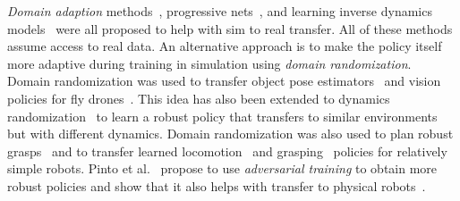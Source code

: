 \emph{Domain adaption} methods~\citep{DBLP:journals/corr/TzengDHFPLSD15, DBLP:journals/corr/GuptaDLAL17}, progressive nets~\citep{DBLP:conf/corl/RusuVRHPH17}, and learning inverse dynamics models~\citep{DBLP:journals/corr/ChristianoSMSBT16} were all proposed to help with sim to real transfer.
All of these methods assume access to real data.
An alternative approach is to make the policy itself more adaptive during training in simulation using \emph{domain randomization}.
Domain randomization was used to transfer object pose estimators~\citep{tobin2017domain} and vision policies for fly drones~\citep{DBLP:conf/rss/SadeghiL17}.
This idea has also been extended to dynamics randomization~\citep{DBLP:journals/corr/AntonovaCSK17, DBLP:journals/corr/abs-1804-10332, DBLP:conf/rss/YuTLT17} to learn a robust policy that transfers to similar environments but with different dynamics.
Domain randomization was also used to plan robust grasps~\citep{DBLP:conf/rss/MahlerLNLDLOG17, DBLP:journals/corr/abs-1709-06670, DBLP:journals/corr/abs-1710-06425} and to transfer learned locomotion~\citep{DBLP:journals/corr/abs-1804-10332} and grasping~\citep{DBLP:journals/corr/abs-1802-09564} policies for relatively simple robots.
Pinto et al.~\citep{DBLP:conf/icml/PintoDSG17} propose to use \emph{adversarial training} to obtain more robust policies and show that it also helps with transfer to physical robots~\citep{DBLP:conf/icra/PintoDG17}.
